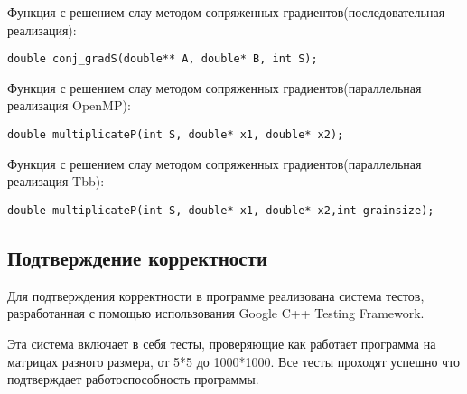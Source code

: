 \documentclass{report}
\begin{document}
\par Функция с решением слау методом сопряженных градиентов(последовательная реализация):
\begin{lstlisting}
double conj_gradS(double** A, double* B, int S);
\end{lstlisting}
\par Функция с решением слау методом сопряженных градиентов(параллельная реализация OpenMP):
\begin{lstlisting}
double multiplicateP(int S, double* x1, double* x2);
\end{lstlisting}
\par Функция с решением слау методом сопряженных градиентов(параллельная реализация Tbb):
\begin{lstlisting}
double multiplicateP(int S, double* x1, double* x2,int grainsize);
\end{lstlisting}

\newpage

\begin{center}
\section*{Подтверждение корректности}
\end{center}
\par Для подтверждения корректности в программе реализована система тестов, разработанная с помощью использования Google C++ Testing Framework.
\par Эта система включает в себя тесты, проверяющие как работает программа на матрицах разного размера, от 5*5 до 1000*1000. Все тесты проходят успешно что подтверждает работоспособность программы.
\newpage
\end{document}

